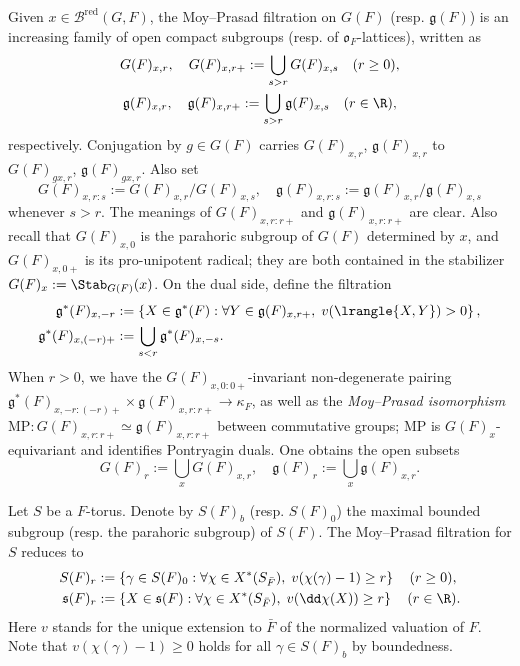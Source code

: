 \documentclass[a4paper,10pt]{article}
\begin{document}
Given $x \in \mathcal{B}^\text{red}(G,F)$, the Moy--Prasad filtration on $G(F)$ (resp. $\mathfrak{g}(F)$) is an increasing family of open compact subgroups (resp. of $\mathfrak{o}_F$-lattices), written as  
\begin{gather*}
	G(F)_{x, r}, \quad G(F)_{x, r+} := \bigcup_{s > r} G(F)_{x, s} \quad (r \geq 0), \\
	\mathfrak{g}(F)_{x,r}, \quad \mathfrak{g}(F)_{x, r+} := \bigcup_{s > r} \mathfrak{g}(F)_{x, s} \quad (r \in \R),
\end{gather*}
respectively. Conjugation by $g \in G(F)$ carries $G(F)_{x,r}$, $\mathfrak{g}(F)_{x,r}$ to $G(F)_{gx,r}$, $\mathfrak{g}(F)_{gx,r}$. Also set
\[ G(F)_{x, r:s} := G(F)_{x,r}/G(F)_{x, s}, \quad \mathfrak{g}(F)_{x, r:s} := \mathfrak{g}(F)_{x, r}/\mathfrak{g}(F)_{x,s} \]
whenever $s > r$. The meanings of $G(F)_{x, r:r+}$ and $\mathfrak{g}(F)_{x, r:r+}$ are clear. Also recall that $G(F)_{x,0}$ is the parahoric subgroup of $G(F)$ determined by $x$, and $G(F)_{x,0+}$ is its pro-unipotent radical; they are both contained in the stabilizer $G(F)_x := \Stab_{G(F)}(x)$. On the dual side, define the filtration
\begin{align*}
	\mathfrak{g}^*(F)_{x,-r} & := \left\{ X \in \mathfrak{g}^*(F) : \forall Y \in \mathfrak{g}(F)_{x,r+}, \;  v(\lrangle{X,Y}) > 0 \right\}, \\
	\mathfrak{g}^*(F)_{x, (-r)+} & := \bigcup_{s < r} \mathfrak{g}^*(F)_{x, -s}.
\end{align*} 
When $r > 0$, we have the $G(F)_{x,0:0+}$-invariant non-degenerate pairing $\mathfrak{g}^*(F)_{x, -r:(-r)+} \times \mathfrak{g}(F)_{x, r:r+} \to \kappa_F$, as well as the \emph{Moy--Prasad isomorphism} \cite{MP96} $\mathrm{MP}: G(F)_{x,r:r+} \simeq \mathfrak{g}(F)_{x, r:r+}$ between commutative groups; $\mathrm{MP}$ is $G(F)_x$-equivariant and identifies Pontryagin duals. One obtains the open subsets
\[ G(F)_r := \bigcup_x G(F)_{x,r}, \quad \mathfrak{g}(F)_r := \bigcup_x \mathfrak{g}(F)_{x,r}. \]

Let $S$ be a $F$-torus. Denote by $S(F)_b$ (resp. $S(F)_0$) the maximal bounded subgroup (resp. the parahoric subgroup) of $S(F)$. The Moy--Prasad filtration for $S$ reduces to
\begin{align*}
	S(F)_r & := \left\{ \gamma \in S(F)_0 : \forall \chi \in X^*(S_{\bar{F}}), \; v(\chi(\gamma)-1) \geq r \right\} \quad (r \geq 0), \\
	\mathfrak{s}(F)_r & := \left\{ X \in \mathfrak{s}(F) : \forall \chi \in X^*(S_{\bar{F}}), \; v(\dd\chi(X)) \geq r \right\} \quad (r \in \R).
\end{align*}
Here $v$ stands for the unique extension to $\bar{F}$ of the normalized valuation of $F$. Note that $v(\chi(\gamma)-1) \geq 0$ holds for all $\gamma \in S(F)_b$ by boundedness.
\end{document}
